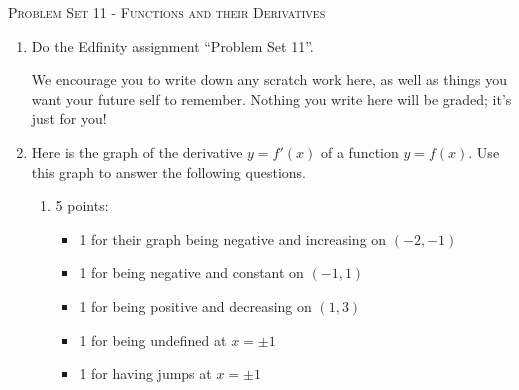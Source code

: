 \documentclass{article}
\newcommand{\doedfinity}[2][\newpage]{
  \begin{problem}[#1]
    Do the Edfinity assignment ``Problem Set #2''.

    We encourage you to write down any scratch work here, as well as
    things you want your future self to remember. Nothing you write
    here will be graded; it's just for you!
  \end{problem}
}
\begin{document}
\begin{center}
  \large\textsc{Problem Set 11 - Functions and their Derivatives}
\end{center}

\begin{enumerate}
\item  {}

  \doedfinity{11}

\item \label{sketch-derivative-and-antiderivative-1}

  Here is the graph of the derivative $y=f'(x)$ of a function $y=f(x)$.
  Use this graph to answer the following questions.


  \begin{enumerate}
  \item \label{sketch-derivative-and-antiderivative-1-f''}

    \begin{grading}
      5 points:
      \begin{itemize}[nosep]
      \item 1 for their graph being negative and increasing on $(-2, -1)$
      \item 1 for being negative and constant on $(-1, 1)$
      \item 1 for being positive and decreasing on $(1, 3)$
      \item 1 for being undefined at $x = \pm 1$
      \item 1 for having jumps at $x = \pm 1$
      \end{itemize}
    \end{grading}


\end{enumerate}
\end{enumerate}
\end{document}
